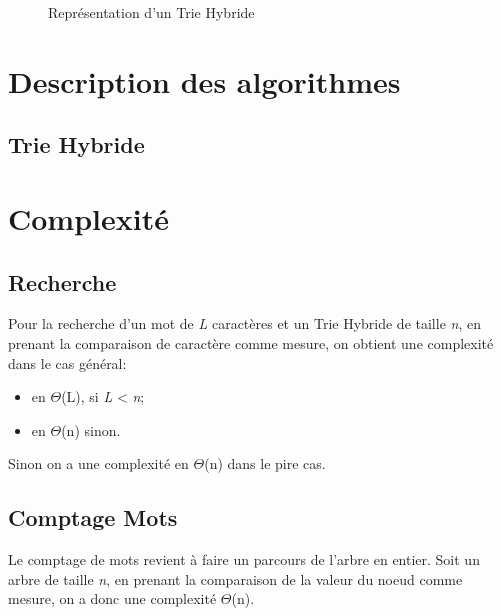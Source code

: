 \documentclass[a4paper,12pt]{report}
\begin{document}
\begin{figure}[!htbp]
\caption{Représentation d'un Trie Hybride}
\end{figure}

\section{Description des algorithmes}


\subsection{Trie Hybride}



\section{Complexité}
\subsection{Recherche}
Pour la recherche d'un mot de \textit{L} caractères et un Trie Hybride de taille \textit{n}, 
en prenant la comparaison de caractère comme mesure, on obtient une complexité dans le cas général:
\begin{itemize}
 \item en $\Theta$(L), si \textit{L} < \textit{n};
 \item en $\Theta$(n) sinon.
\end{itemize}
Sinon on a une complexité en $\Theta$(n) dans le pire cas.
\subsection{Comptage Mots}
Le comptage de mots revient à faire un parcours de l'arbre en entier.
Soit un arbre de taille \textit{n}, en prenant la comparaison de la valeur du noeud comme mesure,
on a donc une complexité $\Theta$(n).
\end{document}
